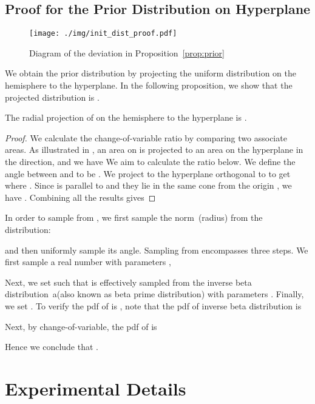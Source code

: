 \subsection{Proof for the Prior Distribution on  Hyperplane}\label{app:prior_distribution}

\begin{figure}[htbp]
    \centering
    \texttt{[image: ./img/init\_dist\_proof.pdf]}
    \caption{Diagram of the deviation in Proposition~\ref{prop:prior}}
    \label{fig:init_dist}
\end{figure}

We obtain the prior distribution  by projecting the uniform distribution  on the hemisphere  to the  hyperplane. In the following proposition, we show that the projected distribution is . 
\begin{proposition}
\label{prop:prior}
The radial projection of  on the hemisphere  to the  hyperplane is .
\end{proposition}
\begin{proof}
We calculate the change-of-variable ratio by comparing two associate areas. As illustrated in , an area  on  is projected to an area  on the hyperplane in the  direction, and we have  We aim to calculate the ratio  below. We define the angle between  and  to be . We project  to the hyperplane orthogonal to  to get  where . Since  is parallel to  and they lie in the same cone from the origin , we have . Combining all the results gives

\end{proof}

In order to sample from , we first sample the norm~(radius)  from the distribution:

and then uniformly sample its angle. Sampling from  encompasses three steps. We first sample a real number  with parameters , \ie

Next, we set  such that  is effectively sampled from the inverse beta distribution~a(also known as beta prime distribution) with parameters . Finally, we set . To verify the pdf of  is , note that the pdf of inverse beta distribution is

Next, by change-of-variable, the pdf of  is


Hence we conclude that .

\section{Experimental Details}

